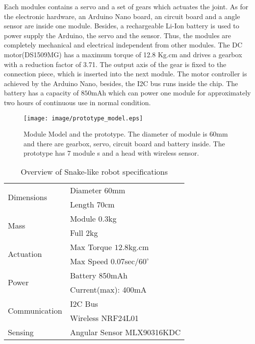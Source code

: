 \documentclass[letterpaper, 10 pt, conference]{ieeeconf}
\begin{document}
Each modules contains a servo and a set of gears which actuates the joint. As for the electronic hardware, an Arduino Nano board, an circuit board and a angle sensor are inside one module. Besides, a rechargeable Li-Ion battery is used to power supply the Arduino, the servo and the sensor. Thus, the modules are completely mechanical and electrical independent from other modules.
The DC motor(DS1509MG) has a maximum torque of 12.8 Kg.cm and drives a gearbox with a reduction factor of 3.71. The output axis of the gear is fixed to the connection piece, which is inserted into the next module. The motor controller is achieved by the Arduino Nano, besides, the I2C bus runs inside the chip.
The battery has a capacity of $850$mAh which can power one module for approximately two hours of continuous use in normal condition.

\begin{figure}[thpb]
    \centering
    \texttt{[image: image/prototype\_model.eps]}
    \caption{Module Model and the prototype. The diameter of module is $60$mm and there are gearbox, servo, circuit board and battery inside. The prototype has 7 module s and a head with wireless sensor.}

\end{figure}

\begin{table}[h]
\caption{Overview of Snake-like robot specifications}
\label{table_example}
\begin{center}
\begin{tabular}{|l|l|} \hline
\multirow{2}{*}{Dimensions} & Diameter $60$mm \\
& Length $70$cm \\
\hline
\multirow{2}{*}{Mass} & Module 0.3kg  \\
& Full  2kg \\
\hline
\multirow{2}{*}{Actuation} & Max Torque $12.8$kg.cm \\
& Max Speed 0.07sec/$60^{\circ}$\\
\hline
\multirow{2}{*}{Power} & Battery 850mAh\\
& Current(max): 400mA\\
\hline
\multirow{2}{*}{Communication} & I2C Bus \\
& Wireless NRF24L01\\
\hline
\multirow{1}{*}{Sensing} & Angular Sensor MLX90316KDC
 \\
\hline
\end{tabular}
\end{center}
\end{table}
\end{document}
